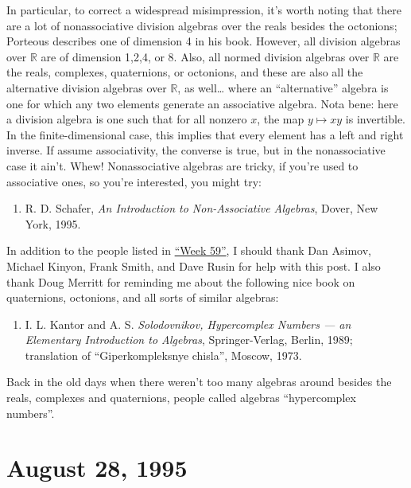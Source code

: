 \documentclass{article}
\def\tightlist{}
\begin{document}
In particular, to correct a widespread misimpression, it's worth noting
that there are a lot of nonassociative division algebras over the reals
besides the octonions; Porteous describes one of dimension 4 in his
book. However, all division algebras over \(\mathbb{R}\) are of
dimension 1,2,4, or 8. Also, all normed division algebras over
\(\mathbb{R}\) are the reals, complexes, quaternions, or octonions, and
these are also all the alternative division algebras over
\(\mathbb{R}\), as well\ldots{} where an ``alternative'' algebra is one
for which any two elements generate an associative algebra. Nota bene:
here a division algebra is one such that for all nonzero \(x\), the map
\(y \mapsto xy\) is invertible. In the finite-dimensional case, this
implies that every element has a left and right inverse. If assume
associativity, the converse is true, but in the nonassociative case it
ain't. Whew! Nonassociative algebras are tricky, if you're used to
associative ones, so you're interested, you might try:

\begin{enumerate}
\def\labelenumi{\arabic{enumi})}
\setcounter{enumi}{3}
\tightlist
\item
  R. D. Schafer, \emph{An Introduction to Non-Associative Algebras},
  Dover, New York, 1995.
\end{enumerate}

In addition to the people listed in \protect\hyperlink{week59}{``Week
59''}, I should thank Dan Asimov, Michael Kinyon, Frank Smith, and Dave
Rusin for help with this post. I also thank Doug Merritt for reminding
me about the following nice book on quaternions, octonions, and all
sorts of similar algebras:

\begin{enumerate}
\def\labelenumi{\arabic{enumi})}
\setcounter{enumi}{4}
\tightlist
\item
  I. L. Kantor and A. S. \emph{Solodovnikov, Hypercomplex Numbers --- an
  Elementary Introduction to Algebras}, Springer-Verlag, Berlin, 1989;
  translation of ``Giperkompleksnye chisla'', Moscow, 1973.
\end{enumerate}

Back in the old days when there weren't too many algebras around besides
the reals, complexes and quaternions, people called algebras
``hypercomplex numbers''.



\hypertarget{week62}{%
\section{August 28, 1995}\label{week62}}
\end{document}
